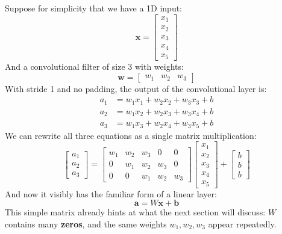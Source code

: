 \highspace
\begin{examplebox}
    Suppose for simplicity that we have a 1D input:
    \begin{equation*}
        \mathbf{x} = 
        \begin{bmatrix}
            x_1 \\ x_2 \\ x_3 \\ x_4 \\ x_5
        \end{bmatrix}
    \end{equation*}
    And a convolutional filter of size 3 with weights:
    \begin{equation*}
        \mathbf{w} =
        \begin{bmatrix}
            w_1 & w_2 & w_3
        \end{bmatrix}
    \end{equation*}
    With stride 1 and no padding, the output of the convolutional layer is:
    \begin{align*}
        a_1 &= w_1 x_1 + w_2 x_2 + w_3 x_3 + b \\
        a_2 &= w_1 x_2 + w_2 x_3 + w_3 x_4 + b \\
        a_3 &= w_1 x_3 + w_2 x_4 + w_3 x_5 + b
    \end{align*}
    We can rewrite all three equations as a single matrix multiplication:
    \begin{equation*}
        \begin{bmatrix}
            a_1 \\ a_2 \\ a_3
        \end{bmatrix}
        =
        \begin{bmatrix}
            w_1 & w_2 & w_3 & 0 & 0 \\
            0 & w_1 & w_2 & w_3 & 0 \\
            0 & 0 & w_1 & w_2 & w_3
        \end{bmatrix}
        \begin{bmatrix}
            x_1 \\ x_2 \\ x_3 \\ x_4 \\ x_5
        \end{bmatrix}
        +
        \begin{bmatrix}
            b \\ b \\ b
        \end{bmatrix}
    \end{equation*}
    And now it visibly has the familiar form of a linear layer:
    \begin{equation*}
        \mathbf{a} = W\mathbf{x} + \mathbf{b}
    \end{equation*}
    This simple matrix already hints at what the next section will discuss: $W$ contains many \textbf{zeros}, and the same weights $w_1, w_2, w_3$ appear repeatedly. 
\end{examplebox}

